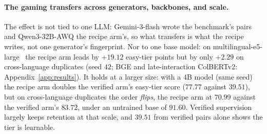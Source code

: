 \paragraph{The gaming transfers across generators, backbones, and scale.}The effect is not tied to one LLM: Gemini-3-flash wrote the benchmark's pairs and Qwen3-32B-AWQ the recipe arm's, so what transfers is what the recipe writes, not one generator's fingerprint. Nor to one base model: on multilingual-e5-large~\citep{wang2024e5} the recipe arm leads by $+19.12$ easy-tier points but by only $+2.29$ on cross-language duplicates (seed $42$; BGE and late-interaction ColBERTv2: Appendix~\ref{app:results}). It holds at a larger size: with a $4$B model (same seed) the recipe arm doubles the verified arm's easy-tier score ($77.77$ against $39.51$), but on cross-language duplicates the order \emph{flips}, the recipe arm at $70.99$ against the verified arm's $83.72$, under an untrained base of $91.60$. Verified supervision largely keeps retention at that scale, and $39.51$ from verified pairs alone shows the tier is learnable.
